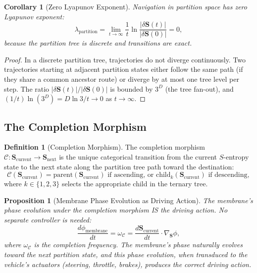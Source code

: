 \documentclass[12pt]{article}
\newtheorem{proposition}[theorem]{Proposition}
\newtheorem{corollary}[theorem]{Corollary}
\theoremstyle{definition}
\newtheorem{definition}[theorem]{Definition}
\theoremstyle{remark}
\begin{document}
\begin{corollary}[Zero Lyapunov Exponent]
\label{cor:zero_lyapunov}
Navigation in partition space has zero Lyapunov exponent:
\begin{equation}
  \lambda_{\mathrm{partition}} = \lim_{t \to \infty} \frac{1}{t} \ln\!\frac{|\delta\mathbf{S}(t)|}{|\delta\mathbf{S}(0)|} = 0,
  \label{eq:zero_lyapunov}
\end{equation}
because the partition tree is discrete and transitions are exact.
\end{corollary}

\begin{proof}
In a discrete partition tree, trajectories do not diverge continuously. Two trajectories starting at adjacent partition states either follow the same path (if they share a common ancestor route) or diverge by at most one tree level per step. The ratio $|\delta\mathbf{S}(t)|/|\delta\mathbf{S}(0)|$ is bounded by $3^D$ (the tree fan-out), and $(1/t)\ln(3^D) = D\ln 3/t \to 0$ as $t \to \infty$.
\end{proof}

\subsection{The Completion Morphism}

\begin{definition}[Completion Morphism]
\label{def:completion}
The completion morphism $\mathcal{C}: \mathbf{S}_{\mathrm{current}} \to \mathbf{S}_{\mathrm{next}}$ is the unique categorical transition from the current $S$-entropy state to the next state along the partition tree path toward the destination:
\begin{equation}
  \mathcal{C}(\mathbf{S}_{\mathrm{current}}) = \mathrm{parent}(\mathbf{S}_{\mathrm{current}}) \text{ if ascending, or } \mathrm{child}_k(\mathbf{S}_{\mathrm{current}}) \text{ if descending},
  \label{eq:completion_morphism}
\end{equation}
where $k \in \{1, 2, 3\}$ selects the appropriate child in the ternary tree.
\end{definition}

\begin{proposition}[Membrane Phase Evolution as Driving Action]
\label{prop:phase_driving}
The membrane's phase evolution under the completion morphism IS the driving action. No separate controller is needed:
\begin{equation}
  \frac{d\phi_{\mathrm{membrane}}}{dt} = \omega_{\mathcal{C}} = \frac{d\mathbf{S}_{\mathrm{current}}}{dt} \cdot \nabla_{\mathbf{S}} \phi,
  \label{eq:phase_driving}
\end{equation}
where $\omega_{\mathcal{C}}$ is the completion frequency. The membrane's phase naturally evolves toward the next partition state, and this phase evolution, when transduced to the vehicle's actuators (steering, throttle, brakes), produces the correct driving action.
\end{proposition}
\end{document}
